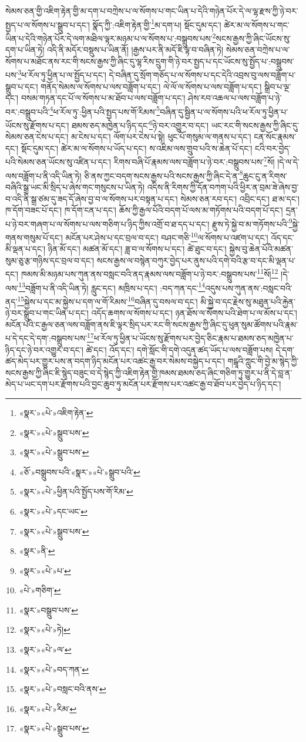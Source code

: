 སེམས་ཅན་གྱི་འཇིག་རྟེན་གྱི་མ་དག་པ་བཀྲེས་པ་ལ་སོགས་པ་གང་ཡིན་པ་དེའི་གཉེན་པོར་དེ་ལ་ལྷ་རྫས་ཀྱི་ཉེ་བར་སྤྱད་པ་ལ་སོགས་པ་སྒྲུབ་པ་དང་། སྣོད་ཀྱི་:འཇིག་རྟེན་གྱི་\footnote{«སྣར་»«པེ་»འཇིག་རྟེན་}མ་དག་པ། སྡོང་དུམ་དང་། ཚེར་མ་ལ་སོགས་པ་གང་ཡིན་པ་དེའི་གཉེན་པོར་དེ་ལག་མཐིལ་ལྟར་མཉམ་པ་ལ་སོགས་པ་:བསྒྲུབས་པས་\footnote{«སྣར་»«པེ་»སྒྲུབ་པས་}སངས་རྒྱས་ཀྱི་ཞིང་ཡོངས་སུ་དག་པ་ཡིན་ཏེ། འདི་ནི་མདོར་བསྡུས་པ་ཡིན་ནོ། །རྒྱས་པར་ནི་མདོ་ཇི་ལྟ་བ་བཞིན་ཏེ། སེམས་ཅན་བཀྲེས་པ་ལ་སོགས་པ་མཐོང་ནས་རང་གི་སངས་རྒྱས་ཀྱི་ཞིང་དུ་ལྷ་རིས་དྲུག་གི་ཉེ་བར་སྤྱད་པ་དང་ཡོངས་སུ་སྤྱོད་པ་:བསྒྲུབས་པས་\footnote{«སྣར་»«པེ་»སྒྲུབ་པས་}ཕ་རོལ་ཏུ་ཕྱིན་པ་ལ་སྤྱོད་པ་དང་། དེ་བཞིན་དུ་སྲོག་གཅོད་པ་ལ་སོགས་པ་དང་དེའི་འབྲས་བུ་ལས་བཟློག་པ་སྒྲུབ་པ་དང་། གནོད་སེམས་ལ་སོགས་པ་ལས་བཟློག་པ་དང་། ལེ་ལོ་ལ་སོགས་པ་ལས་བཟློག་པ་དང་། སྒྲིབ་པ་ལྔ་དང་། བསམ་གཏན་དང་པོ་ལ་སོགས་པ་མ་ཐོབ་པ་ལས་བཟློག་པ་དང་། ཤེས་རབ་འཆལ་པ་ལས་བཟློག་པ་ཉེ་བར་:བསྒྲུབ་པའི་\footnote{«ཅོ་»བསྒྲུབས་པའི་«སྣར་»«པེ་»སྒྲུབ་པའི་}ཕ་རོལ་ཏུ་:ཕྱིན་པའི་སྤྱད་པས་གོ་རིམས་\footnote{«སྣར་»«པེ་»ཕྱིན་པའི་སྤྱོད་པས་གོ་རིམ་}བཞིན་དུ་སྦྱིན་པ་ལ་སོགས་པའི་ཕ་རོལ་ཏུ་ཕྱིན་པ་ཡོངས་སུ་རྫོགས་པ་དང་། ཐམས་ཅད་མཁྱེན་པ་ཉིད་དང་\footnote{«སྣར་»«པེ་»དང་ཡང་}ཉེ་བར་འགྱུར་བ་དང་། ཡང་རང་གི་སངས་རྒྱས་ཀྱི་ཞིང་དུ་སེམས་ཅན་ངེས་པ་དང་། མ་ངེས་པ་དང་། ལོག་པར་ངེས་པ་སྟེ། ཕུང་པོ་གསུམ་ལ་གནས་པ་དང་། ངན་སོང་རྣམས་དང་། སྡོང་དུམ་དང་། ཚེར་མ་ལ་སོགས་པ་ཡོད་པ་དང་། ས་འཇིམ་ལས་གྲུབ་པའི་ས་ཆེན་པོ་དང་། ངའི་བར་བྱེད་པའི་སེམས་ཅན་ཡོངས་སུ་འཛིན་པ་དང་། རིགས་བཞི་པོ་རྣམས་ལས་བཟློག་པ་ཉེ་བར་:བསྒྲུབས་པས་\footnote{«སྣར་»«པེ་»སྒྲུབ་པས་}སོ། །དེ་ལ་དེ་ལས་བཟློག་པ་ནི་འདི་ཡིན་ཏེ། ཅི་ནས་ཀྱང་བདག་སངས་རྒྱས་པའི་སངས་རྒྱས་ཀྱི་ཞིང་དེ་ན་\footnote{«སྣར་»ནི་}ཆུང་ངུ་ན་རིགས་བཞིའི་སྒྲ་ཡང་མི་སྲིད་པ་ཞེས་གང་གསུངས་པ་ཡིན་ཏེ། འདིས་ནི་རིགས་ཀྱི་དོན་བཀག་པའི་ཕྱིར་ན་བྲམ་ཟེ་ཞེས་བྱ་བ་འདི་ནི་སྒྲ་ཙམ་དུ་ཟད་དོ་ཞེས་བྱ་བ་ལ་སོགས་པར་བསྟན་པ་དང་། སེམས་ཅན་རབ་དང་། འབྲིང་དང་། ཐ་མ་དང་། ཁ་དོག་བཟང་པོ་དང་། ཁ་དོག་ངན་པ་དང་། ཆོས་ཀྱི་རྒྱལ་པོའི་བདག་པོ་ལས་མ་གཏོགས་པའི་བདག་པོ་དང་། དྲན་པ་ཉེ་བར་གཞག་པ་ལ་སོགས་པ་ལས་གཅིག་པ་ཉིད་ཀྱིས་འགྲོ་བ་ཐ་དད་པ་དང་། རྫུས་ཏེ་སྐྱེ་བ་མ་གཏོགས་པའི་\footnote{«སྣར་»«པེ་»པ་}སྐྱེ་གནས་གསུམ་པོ་དང་། མངོན་པར་ཤེས་པ་དང་བྲལ་བ་དང་། བཤང་གཅི་\footnote{«པེ་»གཅིག་}ལ་སོགས་པ་འཛག་པ་དང་། འོད་དང་མི་ལྡན་པ་དང་། ཉིན་མོ་དང་། མཚན་མོ་དང་། ཟླ་བ་ལ་སོགས་པ་དང་། ཚེ་ཐུང་བ་དང་། སྐྱེས་བུ་ཆེན་པོའི་མཚན་སུམ་ཅུ་རྩ་གཉིས་དང་བྲལ་བ་དང་། སངས་རྒྱས་ལ་བསྙེན་བཀུར་བྱེད་པར་ནུས་པའི་དགེ་བའི་རྩ་བ་དང་མི་ལྡན་པ་དང་། ཁམས་མི་མཉམ་པས་ཀུན་ནས་བསླང་བའི་ནད་རྣམས་ལས་བཟློག་པ་ཉེ་བར་:བསྒྲུབས་པས་\footnote{«སྣར་»བསྒྲུབ་པས་}སོ།\footnote{«སྣར་»«པེ་»ཏེ།} །དེ་ལས་\footnote{«སྣར་»«པེ་»ལ་}བཟློག་པ་ནི་འདི་ཡིན་ཏེ། རླུང་དང་། མཁྲིས་པ་དང་། :བད་ཀན་དང་\footnote{«སྣར་»«པེ་»བད་ཀན་}འདུས་པས་ཀུན་ནས་:བསླང་བའི་ནད་\footnote{«སྣར་»«པེ་»བསླང་བའི་ནས་}སྐྱེས་པ་དང་མ་སྐྱེས་པ་དག་ལ་གོ་རིམས་\footnote{«སྣར་»«པེ་»རིམ་}བཞིན་དུ་བསལ་བ་དང་། མི་སྐྱེ་བ་དང་རྗེས་སུ་མཐུན་པའི་རྐྱེན་ཉེ་བར་སྒྲུབ་པ་གང་ཡིན་པ་དང་། འདོད་ཆགས་ལ་སོགས་པ་དང་། ཉན་ཐོས་ལ་སོགས་པའི་ཐེག་པ་ལ་མོས་པ་དང་། མངོན་པའི་ང་རྒྱལ་ཅན་ལས་བཟློག་ནས་ཇི་ལྟར་སྲིད་པར་རང་གི་སངས་རྒྱས་ཀྱི་ཞིང་དུ་ཕུན་སུམ་ཚོགས་པའི་རྣམ་པ་དེ་དང་དེ་དག་:བསྒྲུབས་པས་\footnote{«སྣར་»«པེ་»སྒྲུབ་པས་}ཕ་རོལ་ཏུ་ཕྱིན་པ་ཡོངས་སུ་རྫོགས་པར་བྱེད་ཅིང་རྣམ་པ་ཐམས་ཅད་མཁྱེན་པ་ཉིད་དང་ཉེ་བར་འགྱུར་བ་དང་། ཚེ་དང་། འོད་དང་། དགེ་སློང་གི་དགེ་འདུན་ཚད་ཡོད་པ་ལས་བཟློག་པས། དེ་དག་ཚད་མེད་པར་གྱུར་པས་ན་བདག་ཉིད་མངོན་པར་འཚང་རྒྱ་བར་སེམས་བསྐྱེད་པ་དང་། གངྒཱའི་ཀླུང་གི་བྱེ་མ་སྙེད་ཀྱི་སངས་རྒྱས་ཀྱི་ཞིང་ཇི་སྙེད་བཟུང་བ་དེ་སྙེད་ཀྱི་འཇིག་རྟེན་གྱི་ཁམས་ཐམས་ཅད་ཞིང་གཅིག་ཏུ་གྱུར་པ་ནི་དེ་བླ་ན་མེད་པ་ཡང་དག་པར་རྫོགས་པའི་བྱང་ཆུབ་ཏུ་མངོན་པར་རྫོགས་པར་འཚང་རྒྱ་བ་ཐོབ་པར་བྱེད་པ་ཉིད་དང་། 